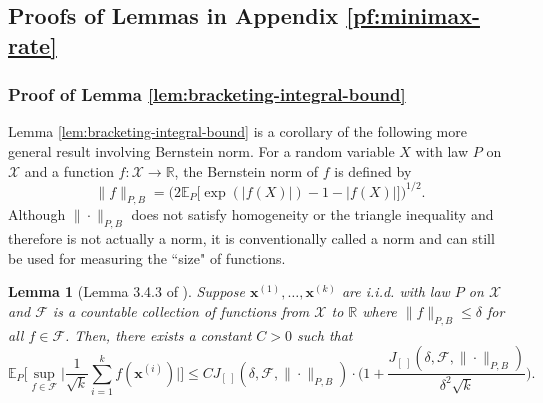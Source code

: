 \documentclass[10pt]{article}
\newtheorem{lemma}{Lemma}
\newcommand{\E}{{\mathbb E}}
\newcommand{\F}{{\mathcal{F}}}
\newcommand{\R}{{\mathbb R}}
\newcommand{\xbf}{{\mathbf{x}}}
\begin{document}
\subsection{Proofs of Lemmas in Appendix \ref{pf:minimax-rate}}

\subsubsection{Proof of Lemma \ref{lem:bracketing-integral-bound}}
\label{pf:bracketing-integral-bound}
Lemma \ref{lem:bracketing-integral-bound} is a corollary of the following 
more general result involving Bernstein norm. For a random variable $X$ 
with law $P$ on $\mathcal{X}$ and a function $f: \mathcal{X} \to \R$, 
the Bernstein norm of $f$ is defined by 
\begin{equation*}
    \|f\|_{P, B} = \Big(2 \E_P\big[\exp(|f(X)|) - 1 - |f(X)|\big]\Big)^{1/2}.
\end{equation*}
Although $\|\cdot\|_{P, B}$ does not satisfy homogeneity or the triangle 
inequality and therefore is not actually a norm, it is conventionally called a 
norm and can still be used for measuring the ``size" of functions.

\begin{lemma}[Lemma 3.4.3 of \citet{vaartwellner96book}]
\label{lem:entropy-integral-bound-Bernstein}
    Suppose $\xbf^{(1)}, \dots, \xbf^{(k)}$ are i.i.d. with law $P$ 
    on $\mathcal{X}$ and $\F$ is a countable collection of functions from 
    $\mathcal{X}$ to $\R$ where $\|f\|_{P, B} \le \delta$ for all $f \in \F$. 
    Then, there exists a constant $C > 0$ such that
    \begin{equation*}
        \E_P\Big[\sup_{f \in \F} \Big| \frac{1}{\sqrt{k}} 
        \sum_{i = 1}^{k} f(\xbf^{(i)})\Big|\Big] 
        \le C J_{[ \ ]}(\delta, \F, \| \cdot \|_{P, B}) 
        \cdot \Big(1 + \frac{J_{[ \ ]}(\delta, \F, 
        \| \cdot \|_{P, B})}{\delta^2 \sqrt{k}}\Big).
    \end{equation*}
\end{lemma}
\end{document}

